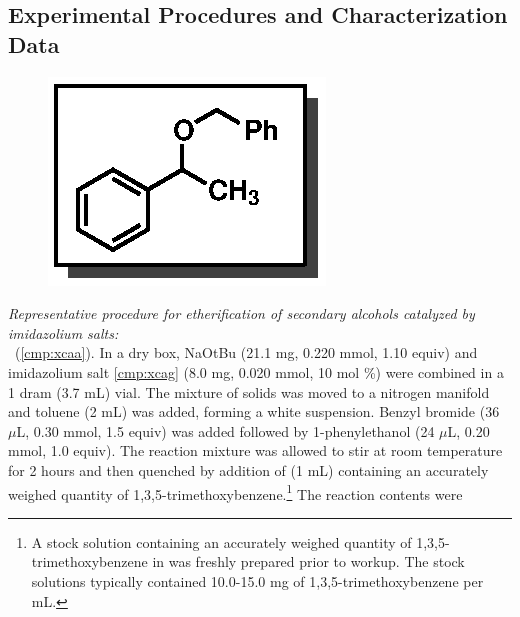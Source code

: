 \subsection{Experimental Procedures and Characterization Data}
\begin{figure}
  \vspace{-25pt}
  \begin{center}
    \includegraphics[scale=0.8]{chp_alkylation/images/xcaa}
  \end{center}
  \vspace{-30pt}
\end{figure}
\textit{Representative procedure for etherification of secondary alcohols
catalyzed by imidazolium salts:} \\ \textbf{\CMPxcaa}\ (\ref{cmp:xcaa}).
In a dry box, NaOtBu (21.1 mg, 0.220 mmol, 1.10 equiv) and imidazolium salt \ref{cmp:xcag} (8.0 mg,
0.020 mmol, 10 mol \%) were combined in a 1 dram (3.7 mL) vial. The mixture of solids was moved to
a nitrogen manifold and toluene (2 mL) was added, forming a white suspension. Benzyl bromide (36
$\mu$L, 0.30 mmol, 1.5 equiv) was added followed by 1-phenylethanol (24 $\mu$L, 0.20 mmol, 1.0
equiv). The reaction mixture was allowed to stir at room temperature for 2 hours and then quenched
by addition of  (1 mL) containing an accurately weighed quantity of
1,3,5-trimethoxybenzene.\footnote{A stock solution containing an accurately weighed quantity of
1,3,5-trimethoxybenzene in  was freshly prepared prior to workup. The stock solutions
typically contained 10.0-15.0 mg of 1,3,5-trimethoxybenzene per mL.} The reaction contents were
